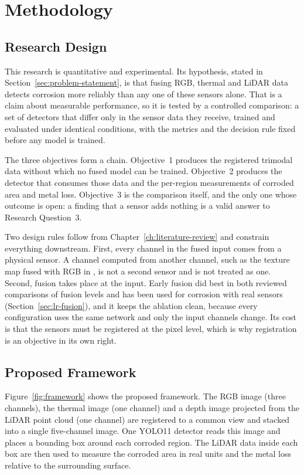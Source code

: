 \chapter[METHODOLOGY]{Methodology}
\label{ch:methodology}

\section{Research Design}
\label{sec:research-design}

This research is quantitative and experimental. Its hypothesis, stated in
Section~\ref{sec:problem-statement}, is that fusing RGB, thermal and LiDAR data
detects corrosion more reliably than any one of these sensors alone. That is a
claim about measurable performance, so it is tested by a controlled comparison:
a set of detectors that differ only in the sensor data they receive, trained and
evaluated under identical conditions, with the metrics and the decision rule
fixed before any model is trained.

The three objectives form a chain. Objective~1 produces the registered trimodal
data without which no fused model can be trained. Objective~2 produces the
detector that consumes those data and the per-region measurements of corroded
area and metal loss. Objective~3 is the comparison itself, and the only one whose
outcome is open: a finding that a sensor adds nothing is a valid answer to
Research Question~3.

Two design rules follow from Chapter~\ref{ch:literature-review} and constrain
everything downstream. First, every channel in the fused input comes from a
physical sensor. A channel computed from another channel, such as the texture
map fused with RGB in \citet{Mao2026}, is not a second sensor and is not treated
as one. Second, fusion takes place at the input. Early fusion did best in both reviewed
comparisons of fusion levels and has been used for corrosion with real sensors
(Section~\ref{sec:lr-fusion}), and it keeps the ablation clean, because every
configuration uses the same network and only the input channels change. Its
cost is that the sensors must be registered at the pixel level, which is why
registration is an objective in its own right.

\section{Proposed Framework}
\label{sec:framework}

Figure~\ref{fig:framework} shows the proposed framework. The RGB image (three
channels), the thermal image (one channel) and a depth image projected from the
LiDAR point cloud (one channel) are registered to a common view and stacked into
a single five-channel image. One YOLO11 detector \citep{Ultralytics2023} reads
this image and places a bounding box around each corroded region. The LiDAR data
inside each box are then used to measure the corroded area in real units and
the metal loss relative to the surrounding surface.

